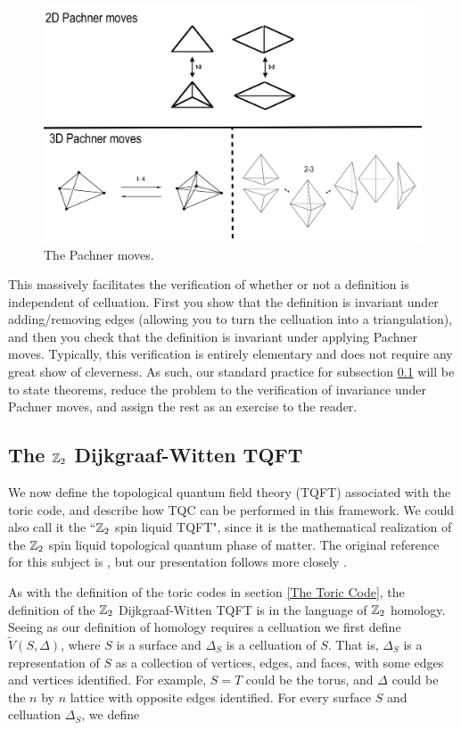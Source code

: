 \documentclass{article}
\theoremstyle{definition}
\numberwithin{figure}{section}
\begin{document}
\begin{figure}
\begin{center}
\includegraphics[scale=0.2]{all-moves}
\caption{The Pachner moves.}
\label{fig:all-moves}
\end{center}
\end{figure}


This massively facilitates the verification of whether or not a definition is independent of celluation. First you show that the definition is invariant under adding/removing edges (allowing you to turn the celluation into a triangulation), and then you check that the definition is invariant under applying Pachner moves. Typically, this verification is entirely elementary and does not require any great show of cleverness. As such, our standard practice for subsection \ref{DW TQFT} will be to state theorems, reduce the problem to the verification of invariance under Pachner moves, and assign the rest as an exercise to the reader.

\subsection{The $\mathbb{Z}_2$ Dijkgraaf-Witten TQFT}
\label{DW TQFT}

We now define the topological quantum field theory (TQFT) associated with the toric code, and describe how TQC can be performed in this framework. We could also call it the ``$\mathbb{Z}_2$ spin liquid TQFT", since it is the mathematical realization of the $\mathbb{Z}_2$ spin liquid topological quantum phase of matter. The original reference for this subject is \cite{dijkgraaf1990topological}, but our presentation follows more closely \cite{qiu2021representations}.

As with the definition of the toric codes in section \ref{The Toric Code}, the definition of the $\mathbb{Z}_2$ Dijkgraaf-Witten TQFT is in the language of $\mathbb{Z}_2$ homology. Seeing as our definition of homology requires a celluation we first define $\tilde{V}(S,\Delta)$, where $S$ is a surface and $\Delta_S$ is a celluation of $S$. That is, $\Delta_S$ is a representation of $S$ as a collection of vertices, edges, and faces, with some edges and vertices identified. For example, $S=T$ could be the torus, and $\Delta$ could be the $n$ by $n$ lattice with opposite edges identified. For every surface $S$ and celluation $\Delta_S$, we define
\end{document}
